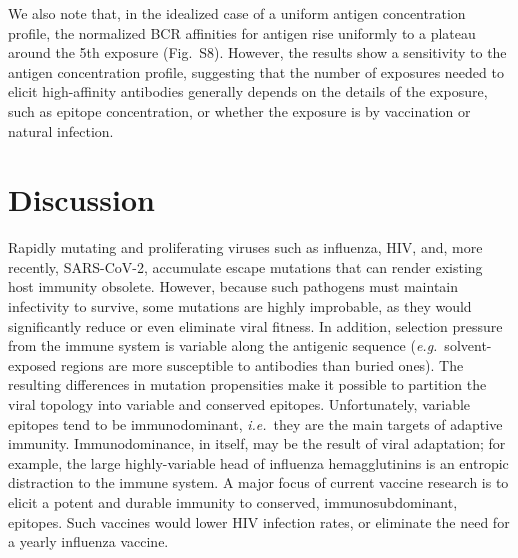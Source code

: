 \documentclass[utf8]{frontiersHLTH}%
\newcommand{\cred}[1]{\textsf{\color{red}#1}}
\def\ie {{\it i.e.}}
\def\eg {{\it e.g.}}
\begin{document}
\cred{We also note that, in the idealized case of a uniform antigen concentration
profile, the normalized BCR affinities for antigen rise uniformly to a
plateau around the 5th exposure (Fig.~S8). However, the results show a
sensitivity to the antigen concentration profile, suggesting that the
number of exposures needed to elicit high-affinity antibodies generally
depends on the details of the exposure, such as epitope concentration, or
whether the exposure is by vaccination or natural infection.}

\section{Discussion}
\label{sec:discussion}
Rapidly mutating and proliferating viruses such as influenza, HIV, and,
more recently, SARS-CoV-2, accumulate escape mutations that can
render existing host immunity obsolete. However, because such pathogens
must maintain infectivity to survive, some mutations are highly
improbable, as they would significantly reduce or even eliminate viral
fitness. In addition, selection pressure from the immune system is variable
along the antigenic sequence (\eg~solvent-exposed regions are more susceptible to antibodies than buried ones).
The resulting differences in mutation
propensities make it possible to partition the viral topology into variable and conserved epitopes.
Unfortunately, variable epitopes tend to be immunodominant, \ie~they are the main
targets of adaptive immunity. Immunodominance, in itself, may be the result of viral
adaptation; for example, the large highly-variable head of influenza hemagglutinins
is an entropic distraction to the immune system.
A major focus of current vaccine research is to elicit a potent and durable
immunity to conserved, immunosubdominant, epitopes.  Such vaccines
would
lower HIV infection rates, or eliminate the need for a yearly influenza
vaccine.
\end{document}
